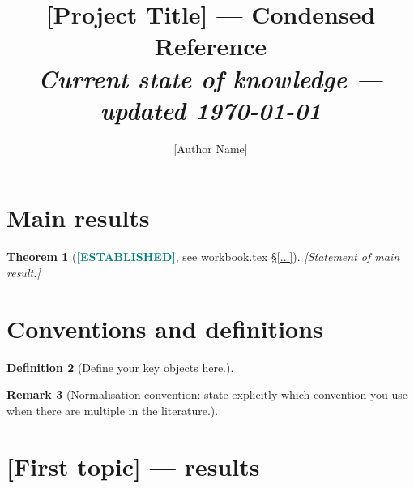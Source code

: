 \documentclass[11pt, a4paper]{article}
\title{[Project Title] — Condensed Reference\\
{\normalsize\textit{Current state of knowledge — updated \today}}}
\author{[Author Name]}
\date{}
\newcommand{\established}{\textcolor{teal}{\textbf{[ESTABLISHED]}}}
\theoremstyle{plain}
\newtheorem{theorem}{Theorem}[section]
\theoremstyle{definition}
\newtheorem{definition}[theorem]{Definition}
\newtheorem{remark}[theorem]{Remark}
\begin{document}
\maketitle

\tableofcontents
\newpage

\section{Main results}
\label{sec:mainresults}


\begin{theorem}[\established, see workbook.tex \S\ref{...}]
[Statement of main result.]
\end{theorem}

\section{Conventions and definitions}
\label{sec:conventions}


\begin{definition}
[Define your key objects here.]
\end{definition}

\begin{remark}
[Normalisation convention: state explicitly which convention you use when
there are multiple in the literature.]
\end{remark}

\section{[First topic] — results}
\label{sec:topic1results}

\end{document}
